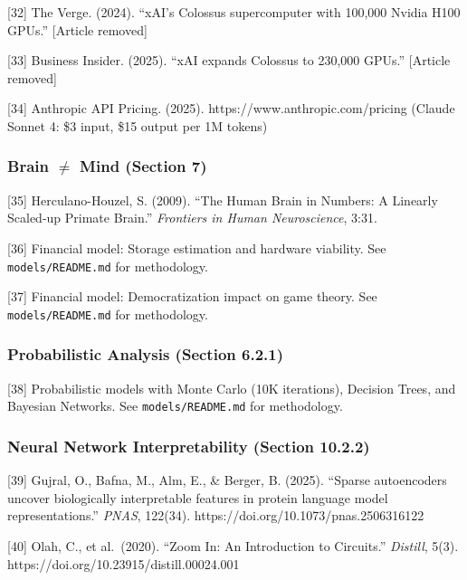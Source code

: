 \documentclass[
]{article}
\begin{document}
{[}32{]} The Verge. (2024). ``xAI's Colossus supercomputer with 100,000
Nvidia H100 GPUs.'' {[}Article removed{]}

{[}33{]} Business Insider. (2025). ``xAI expands Colossus to 230,000
GPUs.'' {[}Article removed{]}

{[}34{]} Anthropic API Pricing. (2025).
https://www.anthropic.com/pricing (Claude Sonnet 4: \$3 input, \$15
output per 1M tokens)

\hypertarget{brain-mind-section-7}{%
\subsubsection{Brain $\neq$ Mind (Section 7)}\label{brain-mind-section-7}}

{[}35{]} Herculano-Houzel, S. (2009). ``The Human Brain in Numbers: A
Linearly Scaled-up Primate Brain.'' \emph{Frontiers in Human
Neuroscience}, 3:31.

{[}36{]} Financial model: Storage estimation and hardware viability. See
\texttt{models/README.md} for methodology.

{[}37{]} Financial model: Democratization impact on game theory. See
\texttt{models/README.md} for methodology.

\hypertarget{probabilistic-analysis-section-6.2.1}{%
\subsubsection{Probabilistic Analysis (Section
6.2.1)}\label{probabilistic-analysis-section-6.2.1}}

{[}38{]} Probabilistic models with Monte Carlo (10K iterations),
Decision Trees, and Bayesian Networks. See \texttt{models/README.md} for
methodology.

\hypertarget{neural-network-interpretability-section-10.2.2}{%
\subsubsection{Neural Network Interpretability (Section
10.2.2)}\label{neural-network-interpretability-section-10.2.2}}

{[}39{]} Gujral, O., Bafna, M., Alm, E., \& Berger, B. (2025). ``Sparse
autoencoders uncover biologically interpretable features in protein
language model representations.'' \emph{PNAS}, 122(34).
https://doi.org/10.1073/pnas.2506316122

{[}40{]} Olah, C., et al.~(2020). ``Zoom In: An Introduction to
Circuits.'' \emph{Distill}, 5(3).
https://doi.org/10.23915/distill.00024.001
\end{document}
